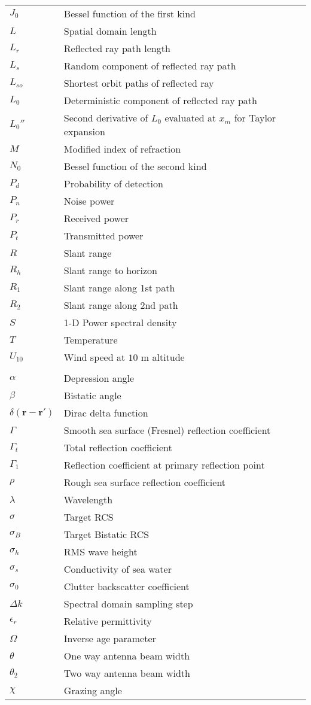 \begin{supertabular}{ll}
$J_0$ & Bessel function of the first kind \\
$L$ & Spatial domain length \\
$L_r$ & Reflected ray path length \\
$L_s$ & Random component of reflected ray path \\
$L_{so}$ & Shortest orbit paths of reflected ray \\
$L_0$ & Deterministic component of reflected ray path \\
$L_0''$ & Second derivative of $L_0$ evaluated at $x_m$ for Taylor expansion\\
$M$ & Modified index of refraction \\
$N_0$ & Bessel function of the second kind \\
$P_d$ & Probability of detection \\
$P_n$ & Noise power\\
$P_r$ & Received power \\
$P_t$ & Transmitted power \\
$R$ & Slant range \\
$R_h$ & Slant range to horizon \\
$R_1$ & Slant range along 1st path \\
$R_2$ & Slant range along 2nd path \\
$S$ & 1-D Power spectral density \\
$T$ & Temperature \\
$U_{10}$ & Wind speed at $10$ m altitude \\
\\
$\alpha$ & Depression angle \\
$\beta$ & Bistatic angle \\
$\delta\left(\mathbf{r}-\mathbf{r}' \right)$ & Dirac delta function \\
$\Gamma$ & Smooth sea surface (Fresnel) reflection coefficient \\
$\Gamma_t$ & Total reflection coefficient \\
$\Gamma_1$ & Reflection coefficient at primary reflection point\\
$\rho$ & Rough sea surface reflection coefficient \\
$\lambda$ & Wavelength \\
$\sigma$ & Target RCS\\
$\sigma_B$ & Target Bistatic RCS \\
$\sigma_h$ & RMS wave height \\
$\sigma_s$ & Conductivity of sea water \\
$\sigma_0$ & Clutter backscatter coefficient \\
$\Delta k$ & Spectral domain sampling step \\
$\epsilon_r$ & Relative permittivity \\
$\Omega$ & Inverse age parameter \\
$\theta$ & One way antenna beam width \\
$\theta_2$ & Two way antenna beam width \\
$\chi$ & Grazing angle \\
\end{supertabular}